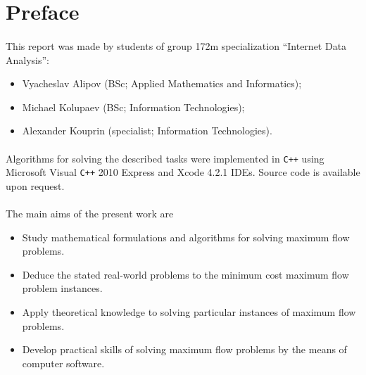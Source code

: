 \section{Preface}

\paragraph{}
	This report was made by students of group 172m specialization ``Internet Data Analysis'':

\begin{itemize}
	\item Vyacheslav Alipov (BSc; Applied Mathematics and Informatics);
	\item Michael Kolupaev (BSc; Information Technologies);
	\item Alexander Kouprin (specialist; Information Technologies).
\end{itemize}

\paragraph{}
	Algorithms for solving the described tasks were implemented in \verb!C++! using Microsoft Visual \verb!C++! 2010 Express and Xcode 4.2.1 IDEs. Source code is available upon request.

\paragraph{}
	The main aims of the present work are 
\begin{itemize}
	\item Study mathematical formulations and algorithms for solving maximum flow problems.
	\item Deduce the stated real-world problems to the minimum cost maximum flow problem instances.
	\item Apply theoretical knowledge to solving particular instances of maximum flow problems.
	\item Develop practical skills of solving maximum flow problems by the means of computer software.
\end{itemize}

